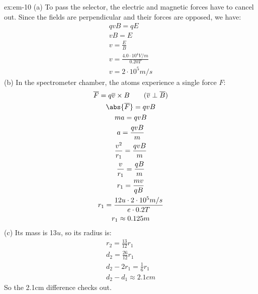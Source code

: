 \begin{solution}{ex:em-10}
  (a) To pass the selector, the electric and magnetic forces have to cancel out. Since the fields are perpendicular and their forces are opposed, we have:
  \[
    \begin{gathered}
      qvB=qE\\
      vB=E\\
      v=\frac{E}{B}\\
      v=\frac{4.0 \cdot 10^4 V/m}{0.20 T}\\
      v=2 \cdot 10^5 m/s
    \end{gathered}
  \]
  (b) In the spectrometer chamber, the atoms experience a single force $F$:
  \[
    \begin{gathered}
      \overline{F}=q \overline{v} \times {B} \qquad \text{($\overline{v} \perp \overline{B}$)}\\
      \abs{\overline{F}} = qvB\\
      ma = qvB\\
      a = \frac{qvB}{m}\\
      \frac{v^2}{r_1} = \frac{qvB}{m}\\
      \frac{v}{r_1} = \frac{qB}{m}\\
      r_1 = \frac{mv}{qB}\\
      r_1 = \frac{12u \cdot 2\cdot 10^{5} m/s}{e \cdot 0.2T}\\
      r_1\approx 0.125 m
    \end{gathered}
  \]
  (c) Its mass is 13$u$, so its radius is:
  \[
    \begin{gathered}
      r_2=\frac{13}{12}r_1\\
      d_2=\frac{26}{12}r_1\\
      d_2-2r_1=\frac{1}{6}r_1\\
      d_2-d_1\approx2.1cm
    \end{gathered}
  \]
  So the 2.1cm difference checks out.
\end{solution}
